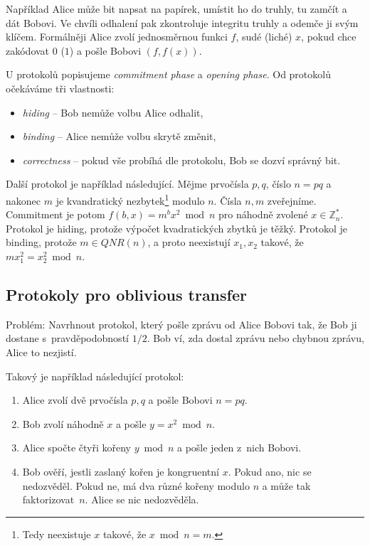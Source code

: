 Například Alice může bit napsat na papírek, umístit ho do truhly, tu
zamčít a dát Bobovi. Ve chvíli odhalení pak zkontroluje integritu truhly
a odemče ji svým klíčem.  Formálněji Alice zvolí jednosměrnou funkci
$f$, sudé (liché) $x$, pokud chce zakódovat $0$ ($1$) a pošle Bobovi
$(f, f(x))$.

U protokolů popisujeme {\em commitment phase} a {\em opening phase}.
Od protokolů očekáváme tři vlastnosti:
\begin{itemize}
    \item {\em hiding} -- Bob nemůže volbu Alice odhalit,
    \item {\em binding} -- Alice nemůže volbu skrytě změnit,
    \item {\em correctness} -- pokud vše probíhá dle protokolu, Bob se dozví správný bit.
\end{itemize}

Další protokol je například následující. Mějme prvočísla $p,q$,
číslo $n = pq$ a nakonec $m$ je kvandratický nezbytek\footnote{Tedy
neexistuje $x$ takové, že $x \bmod n = m$.} modulo $n$. Čísla $n, m$
zveřejníme.  Commitment je potom $f(b, x) = m^b x^2 \bmod n$ pro náhodně
zvolené $x \in \mathbb{Z}^*_n$. Protokol je hiding, protože výpočet
kvadratických zbytků je těžký. Protokol je binding, protože $m \in
QNR(n)$, a proto neexistují $x_1, x_2$ takové, že
$m x_1^2 = x_2^2 \bmod n$.


\subsection{Protokoly pro oblivious transfer}

Problém: Navrhnout protokol, který pošle zprávu od Alice Bobovi tak, že
Bob ji dostane s~pravděpodobností $1/2$. Bob ví, zda dostal zprávu nebo
chybnou zprávu, Alice to nezjistí.

Takový je například následující protokol:
\begin{enumerate}
    \item Alice zvolí dvě prvočísla $p,q$ a pošle Bobovi $n = pq$.
    \item Bob zvolí náhodně $x$ a pošle $y = x^2 \bmod n$.
    \item Alice spočte čtyři kořeny $y \bmod n$ a pošle jeden z~nich
        Bobovi.
    \item Bob ověří, jestli zaslaný kořen je kongruentní $x$. Pokud ano,
        nic se nedozvěděl. Pokud ne, má dva různé kořeny modulo $n$ a
        může tak faktorizovat~$n$. Alice se nic nedozvěděla.
\end{enumerate}

